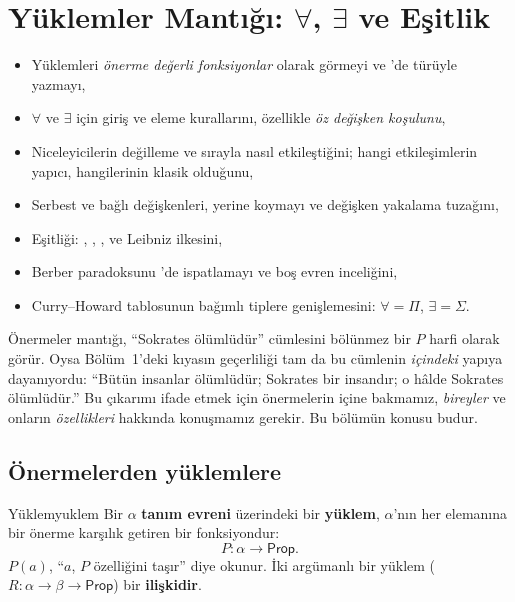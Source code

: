 \chapter{Yüklemler Mantığı: \texorpdfstring{$\forall$}{∀}, \texorpdfstring{$\exists$}{∃} ve Eşitlik}\label{bol:yuklemler}

\begin{bolumhedefleri}
\begin{itemize}
  \item Yüklemleri \emph{önerme değerli fonksiyonlar} olarak görmeyi ve
        \Lean{}'de  türüyle yazmayı,
  \item $\forall$ ve $\exists$ için giriş ve eleme kurallarını, özellikle
        \emph{öz değişken koşulunu},
  \item Niceleyicilerin değilleme ve sırayla nasıl etkileştiğini; hangi
        etkileşimlerin yapıcı, hangilerinin klasik olduğunu,
  \item Serbest ve bağlı değişkenleri, yerine koymayı ve değişken
        yakalama tuzağını,
  \item Eşitliği: , , ,  ve Leibniz ilkesini,
  \item Berber paradoksunu \Lean{}'de ispatlamayı ve boş evren inceliğini,
  \item Curry--Howard tablosunun bağımlı tiplere genişlemesini:
        $\forall = \Pi$, $\exists = \Sigma$.
\end{itemize}
\end{bolumhedefleri}

Önermeler mantığı, ``Sokrates ölümlüdür'' cümlesini bölünmez bir $P$
harfi olarak görür. Oysa Bölüm~1'deki kıyasın geçerliliği tam da bu
cümlenin \emph{içindeki} yapıya dayanıyordu: ``Bütün insanlar
ölümlüdür; Sokrates bir insandır; o hâlde Sokrates ölümlüdür.'' Bu
çıkarımı ifade etmek için önermelerin içine bakmamız, \emph{bireyler} ve
onların \emph{özellikleri} hakkında konuşmamız gerekir. Bu bölümün konusu
budur.

\section{Önermelerden yüklemlere}\label{sec:yuklemler}

\begin{tanim}{Yüklem}{yuklem}
Bir $\alpha$ \textbf{tanım evreni} üzerindeki bir \textbf{yüklem},
$\alpha$'nın her elemanına bir önerme karşılık getiren bir
fonksiyondur:
\[
  P : \alpha \to \mathsf{Prop}.
\]
$P(a)$, ``$a$, $P$ özelliğini taşır'' diye okunur. İki argümanlı bir
yüklem ($R : \alpha \to \beta \to \mathsf{Prop}$) bir \textbf{ilişkidir}.
\end{tanim}

